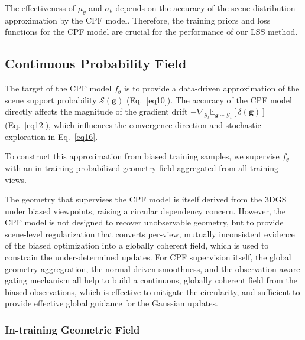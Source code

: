 \documentclass[lettersize,journal]{IEEEtran}
\begin{document}
The effectiveness of $\mu_{\theta}$ and $\sigma_{\theta}$ depends on the accuracy of the scene distribution approximation by the CPF model. Therefore, the training priors and loss functions for the CPF model are crucial for the performance of our LSS method.

\subsection{Continuous Probability Field}\label{sec:cpf}

The target of the CPF model $f_{\theta}$ is to provide 
a data-driven approximation of the scene support probability $\mathcal{S}(\mathbf{g})$ (Eq.~\ref{eq10}).
The accuracy of the CPF model directly affects the magnitude of the gradient drift $-\nabla_{\mathcal{G}_t} \mathbb{E}_{\mathbf{g} \sim \mathcal{G}_t} \left[ \delta(\mathbf{g}) \right]$ (Eq.~\ref{eq12}), which influences the convergence direction and stochastic exploration in Eq.~\ref{eq16}.
{\color{blue}To construct this approximation from biased training samples, we supervise $f_{\theta}$ with an in-training probabilized geometry field aggregated from all training views.

The geometry that supervises the CPF model is itself derived from the 3DGS under biased viewpoints, raising a circular dependency concern. However, the CPF model is not designed to recover unobservable geometry, but to provide scene-level regularization that converts per-view, mutually inconsistent evidence of the biased optimization into a globally coherent field, which is used to constrain the under-determined updates. For CPF supervision itself, the global geometry aggregration, the normal-driven smoothness, and the observation aware gating mechanism all help to build a continuous, globally coherent field from the biased observations, which is effective to mitigate the circularity, and sufficient to provide effective global guidance for the Gaussian updates. 
}


\subsubsection{In-training Geometric Field}
\end{document}
